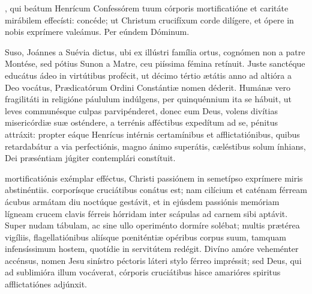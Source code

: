 \documentclass[fontsize=9pt,paper=A6,twoside,BCOR=1mm,DIV=22,headinclude]{scrarticle}
\begin{document}
\begin{multicols}{2}

{
\VRCi 

\MiC 

, qui beátum Henrícum Confessórem tuum córporis mortificatióne et caritáte mirábilem effecísti: concéde; ut Christum crucifíxum corde dilígere, et ópere in nobis exprímere valeámus. Per eúndem Dóminum.



 Suso, Joánnes a Suévia dictus, ubi ex illústri família ortus, cognómen non a patre Montése, sed pótius Sunon a Matre, ceu piíssima fémina retínuit. Juste sanctéque educátus ádeo in virtútibus profécit, ut décimo tértio ætátis anno ad altióra a Deo vocátus, Prædicatórum Ordini Constántiæ nomen déderit. Humánæ vero fragilitáti in religióne páululum indúlgens, per quinquénnium ita se hábuit, ut leves communésque culpas parvipénderet, donec eum Deus, volens divítias misericórdiæ suæ osténdere, a terrénis afféctibus expedítum ad se, pénitus attráxit: propter eáque Henrícus intérnis certamínibus et afflictatiónibus, quibus retardabátur a via perfectiónis, magno ánimo superátis, cæléstibus solum ínhians, Dei præséntiam júgiter contemplári constítuit.

\RVCiv 

 mortificatiónis exémplar efféctus, Christi passiónem in semetípso exprímere miris abstinéntiis. corporísque cruciátibus conátus est; nam cilícium et caténam férream ácubus armátam diu noctúque gestávit, et in ejúsdem passiónis memóriam lígneam crucem clavis férreis hórridam inter scápulas ad carnem sibi aptávit. Super nudam tábulam, ac sine ullo operiménto dormíre solébat; multis prætérea vigíliis, flagellatiónibus aliísque pœniténtiæ opéribus corpus suum, tamquam infensíssimum hostem, quotídie in servitútem redégit. Divíno amóre veheménter accénsus, nomen Jesu sinístro péctoris láteri stylo férreo impréssit; sed Deus, qui ad sublimióra illum vocáverat, córporis cruciátibus hisce amarióres spiritus afflictatiónes adjúnxit.

\RVCv 

}
\end{multicols}
\end{document}
